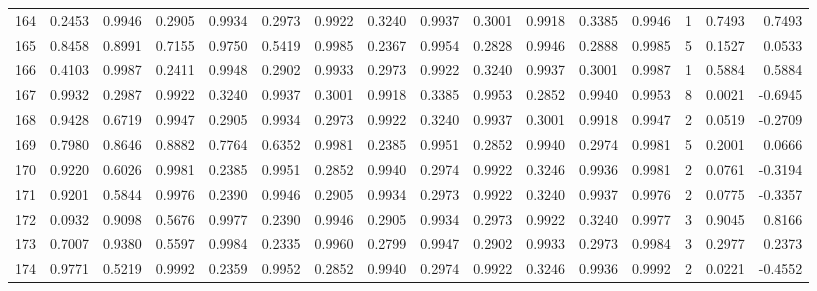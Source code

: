 \begin{tabular}{lrrrrrrrrrrrrrrr}
164 &      0.2453 &  0.9946 &  0.2905 &  0.9934 &  0.2973 &  0.9922 &  0.3240 &  0.9937 &  0.3001 &  0.9918 &   0.3385 &     0.9946 &      1 &                    0.7493 &                     0.7493 \\
165 &      0.8458 &  0.8991 &  0.7155 &  0.9750 &  0.5419 &  0.9985 &  0.2367 &  0.9954 &  0.2828 &  0.9946 &   0.2888 &     0.9985 &      5 &                    0.1527 &                     0.0533 \\
166 &      0.4103 &  0.9987 &  0.2411 &  0.9948 &  0.2902 &  0.9933 &  0.2973 &  0.9922 &  0.3240 &  0.9937 &   0.3001 &     0.9987 &      1 &                    0.5884 &                     0.5884 \\
167 &      0.9932 &  0.2987 &  0.9922 &  0.3240 &  0.9937 &  0.3001 &  0.9918 &  0.3385 &  0.9953 &  0.2852 &   0.9940 &     0.9953 &      8 &                    0.0021 &                    -0.6945 \\
168 &      0.9428 &  0.6719 &  0.9947 &  0.2905 &  0.9934 &  0.2973 &  0.9922 &  0.3240 &  0.9937 &  0.3001 &   0.9918 &     0.9947 &      2 &                    0.0519 &                    -0.2709 \\
169 &      0.7980 &  0.8646 &  0.8882 &  0.7764 &  0.6352 &  0.9981 &  0.2385 &  0.9951 &  0.2852 &  0.9940 &   0.2974 &     0.9981 &      5 &                    0.2001 &                     0.0666 \\
170 &      0.9220 &  0.6026 &  0.9981 &  0.2385 &  0.9951 &  0.2852 &  0.9940 &  0.2974 &  0.9922 &  0.3246 &   0.9936 &     0.9981 &      2 &                    0.0761 &                    -0.3194 \\
171 &      0.9201 &  0.5844 &  0.9976 &  0.2390 &  0.9946 &  0.2905 &  0.9934 &  0.2973 &  0.9922 &  0.3240 &   0.9937 &     0.9976 &      2 &                    0.0775 &                    -0.3357 \\
172 &      0.0932 &  0.9098 &  0.5676 &  0.9977 &  0.2390 &  0.9946 &  0.2905 &  0.9934 &  0.2973 &  0.9922 &   0.3240 &     0.9977 &      3 &                    0.9045 &                     0.8166 \\
173 &      0.7007 &  0.9380 &  0.5597 &  0.9984 &  0.2335 &  0.9960 &  0.2799 &  0.9947 &  0.2902 &  0.9933 &   0.2973 &     0.9984 &      3 &                    0.2977 &                     0.2373 \\
174 &      0.9771 &  0.5219 &  0.9992 &  0.2359 &  0.9952 &  0.2852 &  0.9940 &  0.2974 &  0.9922 &  0.3246 &   0.9936 &     0.9992 &      2 &                    0.0221 &                    -0.4552 \\

\end{tabular}
